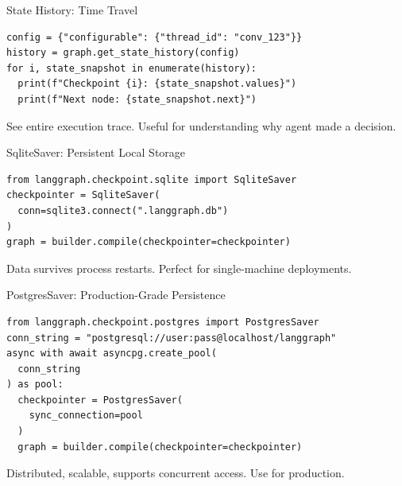 \documentclass[aspectratio=169,11pt]{beamer}
\begin{document}
\begin{frame}[fragile]{State History: Time Travel}
  \begin{codebox}
    \begin{lstlisting}
config = {"configurable": {"thread_id": "conv_123"}}
history = graph.get_state_history(config)
for i, state_snapshot in enumerate(history):
  print(f"Checkpoint {i}: {state_snapshot.values}")
  print(f"Next node: {state_snapshot.next}")
    \end{lstlisting}
  \end{codebox}
  \vspace{0.1cm}
  \begin{tipbox}
    See entire execution trace. Useful for understanding why agent made a decision.
  \end{tipbox}
\end{frame}

\begin{frame}[fragile]{SqliteSaver: Persistent Local Storage}
  \begin{codebox}
    \begin{lstlisting}
from langgraph.checkpoint.sqlite import SqliteSaver
checkpointer = SqliteSaver(
  conn=sqlite3.connect(".langgraph.db")
)
graph = builder.compile(checkpointer=checkpointer)
    \end{lstlisting}
  \end{codebox}
  \vspace{0.1cm}
  \begin{tipbox}
    Data survives process restarts. Perfect for single-machine deployments.
  \end{tipbox}
\end{frame}

\begin{frame}[fragile]{PostgresSaver: Production-Grade Persistence}
  \begin{codebox}
    \begin{lstlisting}
from langgraph.checkpoint.postgres import PostgresSaver
conn_string = "postgresql://user:pass@localhost/langgraph"
async with await asyncpg.create_pool(
  conn_string
) as pool:
  checkpointer = PostgresSaver(
    sync_connection=pool
  )
  graph = builder.compile(checkpointer=checkpointer)
    \end{lstlisting}
  \end{codebox}
  \vspace{0.1cm}
  \begin{tipbox}
    Distributed, scalable, supports concurrent access. Use for production.
  \end{tipbox}
\end{frame}
\end{document}
